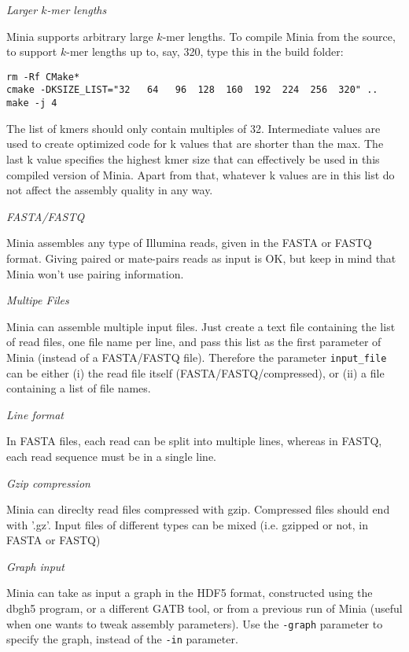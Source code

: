 \documentclass[a4paper]{article}
\begin{document}
\begin{description}
\item \emph{Larger $k$-mer lengths}

Minia supports arbitrary large $k$-mer lengths. To compile Minia from the source, to support $k$-mer lengths up to, say, 320, type this in the build folder:
\begin{verbatim}
rm -Rf CMake*
cmake -DKSIZE_LIST="32   64   96  128  160  192  224  256  320" ..
make -j 4
\end{verbatim}

The list of kmers should only contain multiples of 32. Intermediate values are used to create optimized code for k values that are shorter than the max. The last k value specifies the highest kmer size that can effectively be used in this compiled version of Minia. Apart from that, whatever k values are in this list do not affect the assembly quality in any way.

\item \emph{FASTA/FASTQ}

Minia assembles any type of Illumina reads, given in the FASTA or FASTQ format. Giving paired or mate-pairs reads as input is OK, but keep in mind that Minia won't use pairing information.
\item \emph{Multipe Files}

 Minia can assemble multiple input files. Just create a text file containing the list of read files, one file name per line, and pass this list as the first parameter of Minia (instead of a FASTA/FASTQ file). Therefore the parameter \verb+input_file+ can be either (i) the read file itself (FASTA/FASTQ/compressed), or (ii) a file containing a list of file names.

\item \emph{Line format}

 In FASTA files, each read can be split into multiple lines, whereas in FASTQ, each read sequence must be in a single line.

\item \emph{Gzip compression}

Minia can direclty read files compressed with gzip. Compressed files should end with '.gz'. Input files of different types can be mixed (i.e. gzipped or not, in FASTA or FASTQ)

\item \emph{Graph input}

Minia can take as input a graph in the HDF5 format, constructed using the dbgh5 program, or a different GATB tool, or from a previous run of Minia (useful when one wants to tweak assembly parameters). Use the \verb+-graph+ parameter to specify the graph, instead of the \verb+-in+ parameter.

\end{description}
\end{document}
